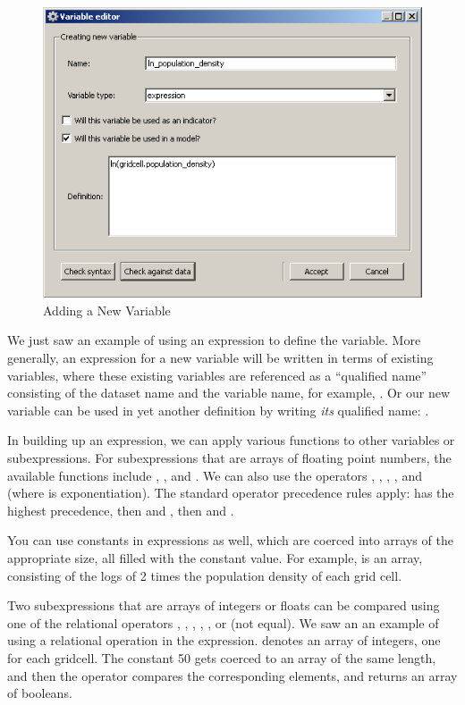 \begin{figure}[htp]
\begin{center}
\includegraphics[scale=0.6]{part-gui/images/model-manager-variable-library-new-variable.png}
\end{center}
\caption{Adding a New Variable}
\label{fig:variable-library-new-variable}
\end{figure}

We just saw an example of using an expression to define the
 variable.  More generally, an expression
for a new variable will be written in terms of existing variables, where
these existing variables are referenced as a ``qualified name'' consisting
of the dataset name and the variable name, for example,
.  Or our new variable can be used in
yet another definition by writing \emph{its} qualified name:
.

In building up an expression, we can apply various functions to other
variables or subexpressions.  For subexpressions that are arrays of
floating point numbers, the available functions include ,
, and .  We can also use the operators \code{+},
\code{-}, \code{*}, \code{/}, and \code{**} (where \code{**} is
exponentiation).  The standard operator precedence rules apply: \code{**}
has the highest precedence, then \code{*} and \code{/}, then \code{+} and
\code{-}.

You can use constants in expressions as well, which are coerced into arrays
of the appropriate size, all filled with the constant value.  For example,
 is an array, consisting of the
logs of 2 times the population density of each grid cell. 

Two subexpressions that are arrays of integers or floats can be compared
using one of the relational operators \code{<}, \code{<=}, \code{==},
\code{>=}, \code{>}, or \code{!=} (not equal).  We saw an an example of
using a relational operation in the 
expression.   denotes an array of
integers, one for each gridcell.  The constant 50 gets coerced to an array
of the same length, and then the \code{>} operator compares the
corresponding elements, and returns an array of booleans.
